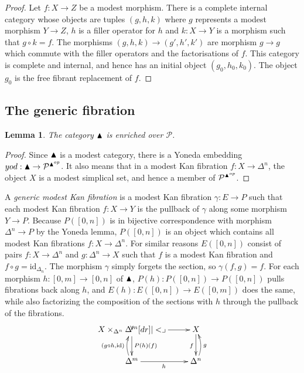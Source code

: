 \documentclass{amsart}
\theoremstyle{plain}
\newtheorem{lemma}[theorem]{Lemma}
\theoremstyle{definition}
\newcommand\cat\mathcal
\newcommand\id{\mathrm{id}}
\begin{document}
\begin{proof} Let $f:X \to Z$ be a modest morphism. There is a complete internal category whose objects are tuples $(g,h,k)$ where $g$ represents a modest morphism $Y\to Z$, $h$ is a filler operator for $h$ and $k:X\to Y$ is a morphism such that $g\circ k = f$. The morphisms $(g,h,k) \to (g', h', k')$ are morphism $g\to g$ which commute with the filler operators and the factorisations of $f$. This category is complete and internal, and hence has an initial object $(g_0,h_0,k_0)$. The object $g_0$ is the free fibrant replacement of $f$.
\end{proof}





\subsection{The generic fibration}

\newcommand\yod{\mathord{yod}}
\begin{lemma} The category $\blacktriangle$ is enriched over $\cat P$. \end{lemma}

\begin{proof} Since $\blacktriangle$ is a modest category, there is a Yoneda embedding $\yod:\simpcat \to \cat P^{\simpcat\dual}$. It also means that in a modest Kan fibration $f:X\to \Delta^n$, the object $X$ is a modest simplical set, and hence a member of $\cat P^{\simpcat\dual}$. 
\end{proof}

A \emph{generic modest Kan fibration} is a modest Kan fibration $\gamma:E\to P$ such that each modest Kan fibration $f:X\to Y$ is the pullback of $\gamma$ along some morphism $Y\to P$. Because $P([0,n])$ is in bijective correspondence with morphism $\Delta^n \to P$ by the Yoneda lemma, $P([0,n])$ is an object which contains all modest Kan fibrations $f:X\to \Delta^n$. For similar reasons $E([0,n])$ consist of pairs $f:X\to \Delta^n$ and $g:\Delta^n \to X$ such that $f$ is a modest Kan fibration and $f\circ g = \id_{\Delta_n}$. The morphism $\gamma$ simply forgets the section, so $\gamma(f,g) = f$. For each morphism $h:[0,m] \to [0,n]$ of $\blacktriangle$, $P(h):P([0,n])\to P([0,n])$ pulls fibrations back along $h$, and $E(h):E([0,n]) \to E([0,m])$ does the same, while also factorizing the composition of the sections with $h$ through the pullback of the fibrations.
\[\xymatrix{
X\times_{\Delta^n} \Delta^m \ar[r] \ar[d]^{P(h)(f)} \pb & X \ar[d]_f \\
\Delta^m \ar[r]_h\ar@/^/[u]^{(g\circ h,\id)} & \Delta^n \ar@/_/[u]_g
}\]
\end{document}
